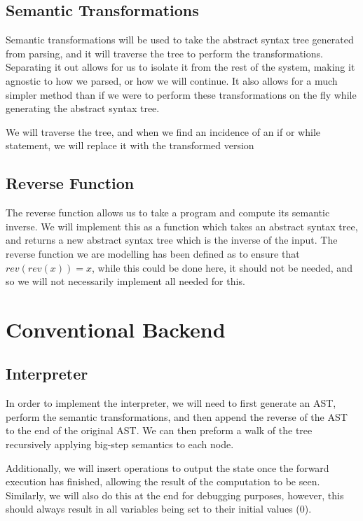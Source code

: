 \subsection*{Semantic Transformations}
Semantic transformations will be used to take the abstract syntax tree generated from parsing, and it will traverse the tree to perform the transformations.
Separating it out allows for us to isolate it from the rest of the system, making it agnostic to how we parsed, or how we will continue.
It also allows for a much simpler method than if we were to perform these transformations on the fly while generating the abstract syntax tree.

We will traverse the tree, and when we find an incidence of an if or while statement, we will replace it with the transformed version

\subsection*{Reverse Function}
The reverse function allows us to take a program and compute its semantic inverse.
We will implement this as a function which takes an abstract syntax tree, and returns a new abstract syntax tree which is the inverse of the input.
The reverse function we are modelling has been defined as to ensure that $rev(rev(x)) = x$, while this could be done here, it should not be needed, and so we will not necessarily implement all needed for this.

\section*{Conventional Backend}

\subsection*{Interpreter}
In order to implement the interpreter, we will need to first generate an AST, perform the semantic transformations, and then append the reverse of the AST to the end of the original AST.
We can then preform a walk of the tree recursively applying big-step semantics to each node.

Additionally, we will insert operations to output the state once the forward execution has finished, allowing the result of the computation to be seen.
Similarly, we will also do this at the end for debugging purposes, however, this should always result in all variables being set to their initial values (0).

